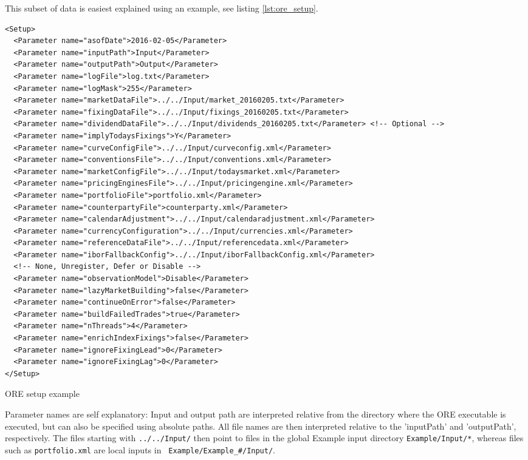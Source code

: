 This subset of data is easiest explained using an example, see listing \ref{lst:ore_setup}.
\begin{listing}[H]
\begin{verbatim}
<Setup>
  <Parameter name="asofDate">2016-02-05</Parameter>
  <Parameter name="inputPath">Input</Parameter>
  <Parameter name="outputPath">Output</Parameter>
  <Parameter name="logFile">log.txt</Parameter>
  <Parameter name="logMask">255</Parameter>
  <Parameter name="marketDataFile">../../Input/market_20160205.txt</Parameter>
  <Parameter name="fixingDataFile">../../Input/fixings_20160205.txt</Parameter>
  <Parameter name="dividendDataFile">../../Input/dividends_20160205.txt</Parameter> <!-- Optional -->
  <Parameter name="implyTodaysFixings">Y</Parameter>
  <Parameter name="curveConfigFile">../../Input/curveconfig.xml</Parameter>
  <Parameter name="conventionsFile">../../Input/conventions.xml</Parameter>
  <Parameter name="marketConfigFile">../../Input/todaysmarket.xml</Parameter>
  <Parameter name="pricingEnginesFile">../../Input/pricingengine.xml</Parameter>
  <Parameter name="portfolioFile">portfolio.xml</Parameter>
  <Parameter name="counterpartyFile">counterparty.xml</Parameter>
  <Parameter name="calendarAdjustment">../../Input/calendaradjustment.xml</Parameter>
  <Parameter name="currencyConfiguration">../../Input/currencies.xml</Parameter>
  <Parameter name="referenceDataFile">../../Input/referencedata.xml</Parameter>
  <Parameter name="iborFallbackConfig">../../Input/iborFallbackConfig.xml</Parameter>
  <!-- None, Unregister, Defer or Disable -->
  <Parameter name="observationModel">Disable</Parameter>
  <Parameter name="lazyMarketBuilding">false</Parameter>
  <Parameter name="continueOnError">false</Parameter>
  <Parameter name="buildFailedTrades">true</Parameter>
  <Parameter name="nThreads">4</Parameter>
  <Parameter name="enrichIndexFixings">false</Parameter>
  <Parameter name="ignoreFixingLead">0</Parameter>
  <Parameter name="ignoreFixingLag">0</Parameter>
</Setup>
\end{verbatim}
\caption{ORE setup example}
\label{lst:ore_setup}
\end{listing}

Parameter names are self explanatory: Input and output path are interpreted relative from the directory where the ORE
executable is executed, but can also be specified using absolute paths. All file names are then interpreted relative to the
'inputPath' and 'outputPath', respectively. The files starting with {\tt ../../Input/} then point to files in the global
Example input directory {\tt Example/Input/*}, whereas files such as {\tt portfolio.xml} are local inputs in {\tt 
Example/Example\_\#/Input/}. 

